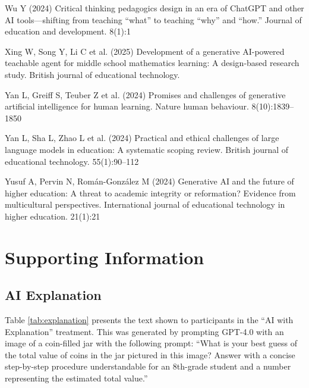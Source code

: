 \documentclass[
  11pt,
]{article}
\newlength{\cslhangindent}
\newenvironment{CSLReferences}[2] %
 {\begin{list}{}{%
  \setlength{\itemindent}{0pt}
  \setlength{\leftmargin}{0pt}
  \setlength{\parsep}{0pt}
  \ifodd #1
   \setlength{\leftmargin}{\cslhangindent}
   \setlength{\itemindent}{-1\cslhangindent}
  \fi
  \setlength{\itemsep}{#2\baselineskip}}}
 {\end{list}}
\begin{document}
\begin{CSLReferences}{1}{0}
Wu Y (2024) Critical thinking pedagogics design in an era of ChatGPT and other AI tools---shifting from teaching {``what''} to teaching {``why''} and {``how.''} Journal of education and development. 8(1):1

Xing W, Song Y, Li C et al. (2025) Development of a generative AI-powered teachable agent for middle school mathematics learning: A design-based research study. British journal of educational technology.

Yan L, Greiff S, Teuber Z et al. (2024) Promises and challenges of generative artificial intelligence for human learning. Nature human behaviour. 8(10):1839--1850

Yan L, Sha L, Zhao L et al. (2024) Practical and ethical challenges of large language models in education: A systematic scoping review. British journal of educational technology. 55(1):90--112

Yusuf A, Pervin N, Román-González M (2024) Generative AI and the future of higher education: A threat to academic integrity or reformation? Evidence from multicultural perspectives. International journal of educational technology in higher education. 21(1):21

\end{CSLReferences}

\clearpage
\processdelayedfloats
\clearpage
\appendix
\setcounter{table}{0}
\setcounter{figure}{0}
\renewcommand{\thetable}{A\arabic{table}}
\renewcommand{\thefigure}{A\arabic{figure}}

\section{Supporting Information}\label{supporting-information}

\subsection{AI Explanation}\label{sec:si-ai-explanation}

Table \ref{tab:explanation} presents the text shown to participants in the ``AI with Explanation'' treatment. This was generated by prompting GPT-4.0 with an image of a coin-filled jar with the following prompt: ``What is your best guess of the total value of coins in the jar pictured in this image? Answer with a concise step-by-step procedure understandable for an 8th-grade student and a number representing the estimated total value.''
\end{document}
